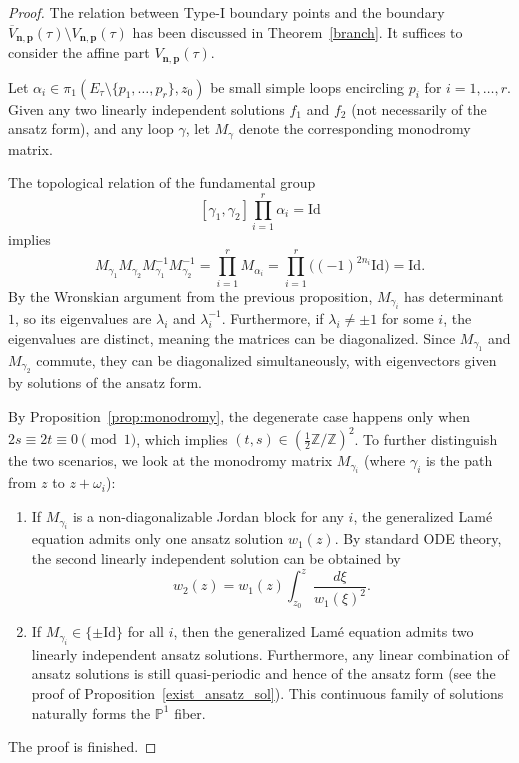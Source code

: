 \documentclass[11pt]{amsart}
\theoremstyle{remark}
\numberwithin{equation}{section}
\begin{document}
\begin{proof}
The relation between Type-I boundary points and the boundary $\overline{V}_{\mathbf{n},\mathbf{p}}(\tau) \setminus V_{\mathbf{n},\mathbf{p}}(\tau)$ has been discussed in Theorem~\ref{branch}. It suffices to consider the affine part $V_{\mathbf{n},\mathbf{p}}(\tau)$. 

Let $\alpha_i \in \pi_1(E_\tau \setminus \{p_1,\dots,p_r\},z_0)$ be small simple loops encircling $p_i$ for $i=1,\dots,r$. Given any two linearly independent solutions $f_1$ and $f_2$ (not necessarily of the ansatz form), and any loop $\gamma$, let $M_{\gamma}$ denote the corresponding monodromy matrix. 

The topological relation of the fundamental group
\[
    [\gamma_1,\gamma_2] \prod_{i=1}^r \alpha_i = \mathrm{Id}
\]
implies
\[
    M_{\gamma_1} M_{\gamma_2} M_{\gamma_1}^{-1} M_{\gamma_2}^{-1} = \prod_{i=1}^r M_{\alpha_i} =  \prod_{i=1}^r \Big( (-1)^{2n_i} \mathrm{Id} \Big) = \mathrm{Id}. 
\]
By the Wronskian argument from the previous proposition, $M_{\gamma_i}$ has determinant $1$, so its eigenvalues are $\lambda_i$ and $\lambda_i^{-1}$. Furthermore, if $\lambda_i \neq \pm 1$ for some $i$, the eigenvalues are distinct, meaning the matrices can be diagonalized. Since $M_{\gamma_1}$ and $M_{\gamma_2}$ commute, they can be diagonalized simultaneously, with eigenvectors given by solutions of the ansatz form.

By Proposition~\ref{prop:monodromy}, the degenerate case happens only when $2s \equiv 2t \equiv 0 \pmod{1}$, which implies $(t,s) \in (\tfrac{1}{2}\mathbb{Z} / \mathbb{Z})^2$. To further distinguish the two scenarios, we look at the monodromy matrix $M_{\gamma_i}$ (where $\gamma_i$ is the path from $z$ to $z+ \omega_i$):
\begin{enumerate}
    \item If $M_{\gamma_i}$ is a non-diagonalizable Jordan block for any $i$, the generalized Lam\'e equation admits only one ansatz solution $w_1(z)$. By standard ODE theory, the second linearly independent solution can be obtained by 
    \[
    w_2(z) = w_1(z) \int_{z_0}^z \frac{d\xi}{w_1(\xi)^2}.
    \]
    \item If $M_{\gamma_i} \in \{ \pm \mathrm{Id} \}$ for all $i$, then the generalized Lam\'e equation admits two linearly independent ansatz solutions. Furthermore, any linear combination of ansatz solutions is still quasi-periodic and hence of the ansatz form (see the proof of Proposition~\ref{exist_ansatz_sol}). This continuous family of solutions naturally forms the $\mathbb{P}^1$ fiber.
\end{enumerate}
The proof is finished.
\end{proof}
\end{document}
